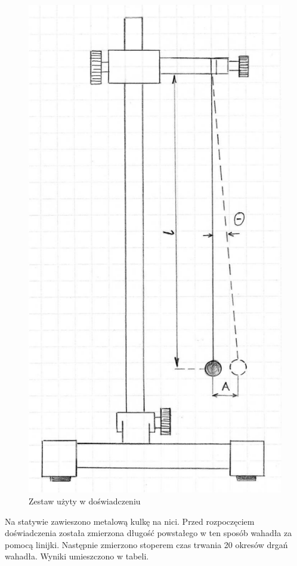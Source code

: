 \documentclass[a4paper,10pt,twoside]{article}
\begin{document}
	\begin{figure}[!htp]
		\centerline{\includegraphics[scale=0.18]{wahadlo}}
		\caption{Zestaw użyty w doświadczeniu}
	\end{figure}
	
	
	Na statywie zawieszono metalową kulkę na nici. Przed rozpoczęciem doświadczenia została zmierzona długość powstałego w ten sposób
	wahadła za pomocą linijki. Następnie zmierzono stoperem czas trwania 20 okresów drgań wahadła. Wyniki umieszczono w tabeli.
	
\end{document}

